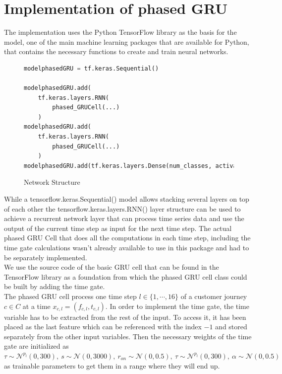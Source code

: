 \section{Implementation of phased GRU}
The implementation uses the Python TensorFlow library as the basis for the model, one of the main machine learning packages that are available for Python, that contains the necessary functions to create and train neural networks.\\
\begin{figure}[h]
    \centering
\begin{lstlisting}[language=Python]
modelphasedGRU = tf.keras.Sequential()

modelphasedGRU.add(
    tf.keras.layers.RNN(
        phased_GRUCell(...)
    )
modelphasedGRU.add(
    tf.keras.layers.RNN(
        phased_GRUCell(...)
    )
modelphasedGRU.add(tf.keras.layers.Dense(num_classes, activation='softmax'))
\end{lstlisting}
\caption{Network Structure}
\label{fig:network structure}
\end{figure}
While a tensorflow.keras.Sequential() model allows stacking several layers on top of each other the tensorflow.keras.layers.RNN() layer structure can be used to achieve a recurrent network layer that can process time series data and use the output of the current time step as input for the next time step. The actual phased GRU Cell that does all the computations in each time step, including the time gate calculations wasn't already available to use in this package and had to be separately implemented. \\
We use the source code of the basic GRU cell that can be found in the TensorFlow library \cite{unknown-author-2023} as a foundation from which the phased GRU cell class could be built by adding the time gate.\\
The phased GRU cell process one time step $l\in\{1,\cdots,16\}$ of a customer journey $c\in C$ at a time $x_{c,l}= (f_{c,l},t_{c,l})$. 
In order to implement the time gate, the time variable has to be extracted from the rest of the input. To access it, it has been placed as the last feature which can be referenced with the index $-1$ and stored separately from the other input variables. 
Then the necessary weights of the time gate are initialized as $\tau \sim \mathcal{N}^{p_l}(0,300),\ s\sim \mathcal{N}(0,3000),\ r_{on}\sim \mathcal{N}(0, 0.5),\ \tau \sim \mathcal{N}^{p_l}(0,300),\ \alpha\sim \mathcal{N}(0,0.5)$ as trainable parameters to get them in a range where they will end up. \\

